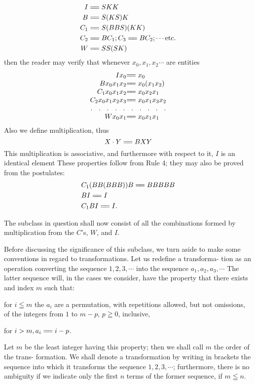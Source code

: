 \documentclass[10pt, twoside]{extarticle}
\newcommand{\td}[2][] {\todo[tickmarkheight=3pt, inline, size=\tiny, #1]{#2}}
\newcommand\longeq{=\joinrel=}
\theoremstyle{breaktheorem}
\theoremstyle{mylemma}
\theoremstyle{mydefinition}
\theoremstyle{mycorollary}
\begin{document}
\begin{align*}
  I &\longeq SKK \\
  B &\longeq S(KS)K \\
  C_1 &\longeq S(BBS)(KK) \\
  C_2 &\longeq BC_1; C_3 \longeq BC_2; \cdots \text{etc.} \\
  W &\longeq SS(SK)
\end{align*}
then the reader may verify that whenever \(x_0, x_1, x_2 \cdots\) are entities
\begin{equation*}
  \renewcommand{\arraycolsep}{0pt}%
  \begin{array}{rl}
  Ix_0 &\longeq x_0 \\
  Bx_0x_1x_2 &\longeq x_0(x_1x_2) \\
  C_1x_0x_1x_2 &\longeq x_0x_2x_1 \\
  C_2x_0x_1x_2x_3 &\longeq x_0x_1x_3x_2 \\
  \hdotsfor[5]{2} \\
  Wx_0x_1 &\longeq x_0x_1x_1
  \end{array}
\end{equation*}
Also we define multiplication, thus
\[X\cdot Y \longeq BXY\]
This multiplication is associative, and furthermore with respect to it, \(I\) is an
identical element These properties follow from Rule 4; they may also be
proved from the postulates:
\begin{align*}
  &C_1(BB(BBB))B \longeq BBBBB \\
  &BI \longeq I \\
  &C_1BI \longeq I. \\
\end{align*}

The subclass in question shall now consist of all the combinations formed by multiplication from the \(C\)'s, \(W\), and \(I\).

Before discussing the significance of this subclass, we turn aside to make
some conventions in regard to transformations. Let us redefine a transforma-
tion as an operation converting the sequence \(1, 2, 3, \cdots\) into the sequence
\(a_1, a_2, a_3, \cdots\) The latter sequence will, in the cases we consider, have the
property that there exists and index \(m\) such that:
\begin{enumerate*}[label=\arabic*)]
\item for \(i \leqq m\) the \(a_i\) are a
  permutation, with repetitions allowed, but not omissions, of the integers from
  \(1\) to \(m - p\), \(p \geqq 0\)\td{long minus sign}, inclusive, \item for \(i > m, a_i \longeq i - p\). \end{enumerate*} Let \(m\) be the least
integer having this property; then we shall call \(m\) the order of the trans-
formation. We shall denote a transformation by writing in brackets the
sequence into which it transforms the sequence \(1, 2, 3, \cdots\); furthermore,
there is no ambiguity if we indicate only the first \(n\) terms of the former
sequence, if \(m \leqq n\).
\end{document}
